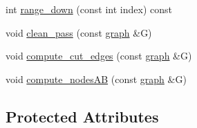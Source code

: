 \begin{DoxyCompactItemize}
\item 
int \mbox{\hyperlink{classfm__partition_ab0bfbda97056ac75ab5fbfa6fd20fd03}{range\+\_\+down}} (const int index) const
\item 
void \mbox{\hyperlink{classfm__partition_a15197263e5318f824e0cde66ea9132b7}{clean\+\_\+pass}} (const \mbox{\hyperlink{classgraph}{graph}} \&G)
\item 
void \mbox{\hyperlink{classfm__partition_a03c76998f985593caddc4979a28b9042}{compute\+\_\+cut\+\_\+edges}} (const \mbox{\hyperlink{classgraph}{graph}} \&G)
\item 
void \mbox{\hyperlink{classfm__partition_aaa8f24af3be860bfa42a171c25420c2c}{compute\+\_\+nodes\+AB}} (const \mbox{\hyperlink{classgraph}{graph}} \&G)
\end{DoxyCompactItemize}
\subsection*{Protected Attributes}
